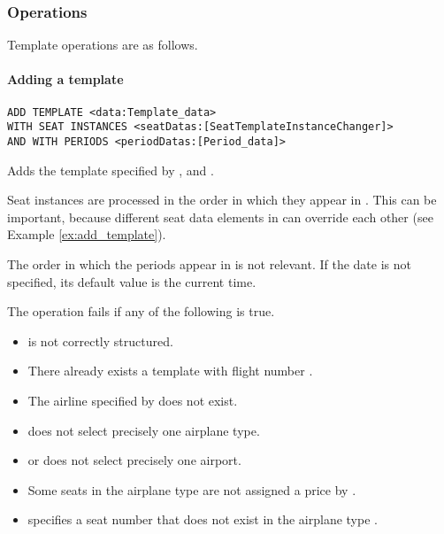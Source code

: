 \subsubsection{Operations}
Template operations are as follows.
\paragraph{Adding a template}
\begin{operation}
  \label{op:add_template}
  \begin{lstlisting}
ADD TEMPLATE <data:Template_data>
WITH SEAT INSTANCES <seatDatas:[SeatTemplateInstanceChanger]>
AND WITH PERIODS <periodDatas:[Period_data]>
  \end{lstlisting}
\end{operation}
Adds the template specified by ,  and
.

Seat instances are processed in the order in which they appear in
. This can be important, because different seat data elements in
 can override each other (see Example \ref{ex:add_template}).

The order in which the periods appear in  is not relevant. If
the date  is not specified, its default value is the
current time.


The operation fails if any of the following is true.
\begin{itemize}
  \item {} is not correctly structured.
  \item There already exists a template with flight number .
  \item The airline specified by  does not exist.
  \item {} does not select precisely one airplane type.
  \item {} or  does not select precisely one airport.
  \item Some seats in the airplane type  are not assigned a price
    by .
  \item {} specifies a seat number that does not exist in the
    airplane type .
\end{itemize}

